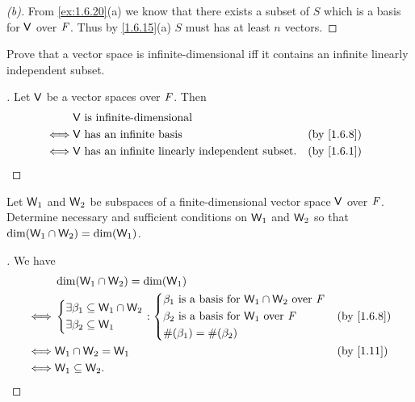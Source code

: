 \begin{proof}[(b)]
  From \cref{ex:1.6.20}(a) we know that there exists a subset of \(S\) which is a basis for \(\mathsf{V}\) over \(\mathit{F}\).
  Thus by \cref{1.6.15}(a) \(S\) must has at least \(n\) vectors.
\end{proof}

\begin{ex}\label{ex:1.6.21}
  Prove that a vector space is infinite-dimensional iff it contains an infinite linearly independent subset.
\end{ex}

\begin{proof}[]
  Let \(\mathsf{V}\) be a vector spaces over \(\mathit{F}\).
  Then
  \begin{align*}
         & \V \text{ is infinite-dimensional}                                                    \\
    \iff & \V \text{ has an infinite basis}                        &  & \text{(by \cref{1.6.8})} \\
    \iff & \V \text{ has an infinite linearly independent subset}. &  & \text{(by \cref{1.6.1})}
  \end{align*}
\end{proof}

\begin{ex}\label{ex:1.6.22}
  Let \(\mathsf{W}_1\) and \(\mathsf{W}_2\) be subspaces of a finite-dimensional vector space \(\mathsf{V}\) over \(\mathit{F}\).
  Determine necessary and sufficient conditions on \(\mathsf{W}_1\) and \(\mathsf{W}_2\) so that \(\dim(\mathsf{W}_1 \cap \mathsf{W}_2) = \dim(\mathsf{W}_1)\).
\end{ex}

\begin{proof}[]
  We have
  \begin{align*}
         & \dim(\W_1 \cap \W_2) = \dim(\W_1)                                                               \\
    \iff & \begin{dcases}
             \exists \beta_1 \subseteq \W_1 \cap \W_2 \\
             \exists \beta_2 \subseteq \W_1
           \end{dcases} : \begin{dcases}
                            \beta_1 \text{ is a basis for } \W_1 \cap \W_2 \text{ over } \F \\
                            \beta_2 \text{ is a basis for } \W_1 \text{ over } \F           \\
                            \#(\beta_1) = \#(\beta_2)
                          \end{dcases} &  & \text{(by \cref{1.6.8})}                  \\
    \iff & \W_1 \cap \W_2 = \W_1                                              &  & \text{(by \cref{1.11})} \\
    \iff & \W_1 \subseteq \W_2.
  \end{align*}
\end{proof}

